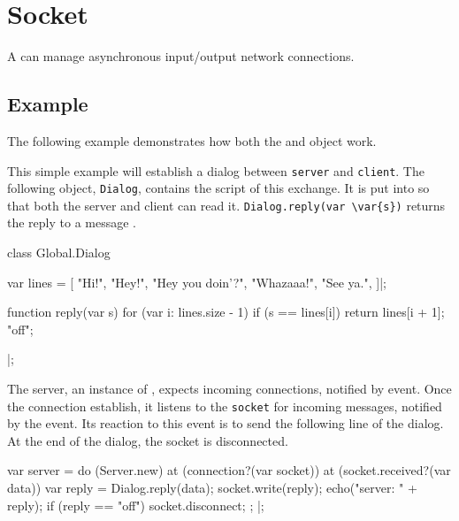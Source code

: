 
\section{Socket}

A  can manage asynchronous input/output network connections.

\subsection{Example}

The following example demonstrates how both the  and
 object work.

This simple example will establish a dialog between \lstinline|server| and
\lstinline|client|.  The following object, \lstinline|Dialog|, contains the
script of this exchange.  It is put into  so that both the
server and client can read it.  \lstinline|Dialog.reply(var \var{s})|
returns the reply to a message .

\begin{urbiscript}
class Global.Dialog
{
  var lines =
  [
    "Hi!",
    "Hey!",
    "Hey you doin'?",
    "Whazaaa!",
    "See ya.",
  ]|;

  function reply(var s)
  {
    for (var i: lines.size - 1)
      if (s == lines[i])
        return lines[i + 1];
    "off";
  }
}|;
\end{urbiscript}

The server, an instance of , expects incoming connections,
notified by  event.  Once the connection
establish, it listens to the \lstinline|socket| for incoming messages,
notified by the  event.  Its reaction to this event is to
send the following line of the dialog.  At the end of the dialog, the socket
is disconnected.

\begin{urbiscript}
var server =
  do (Server.new)
  {
    at (connection?(var socket))
      at (socket.received?(var data))
      {
        var reply = Dialog.reply(data);
        socket.write(reply);
        echo("server: " + reply);
        if (reply == "off")
          socket.disconnect;
      };
  }|;
\end{urbiscript}

